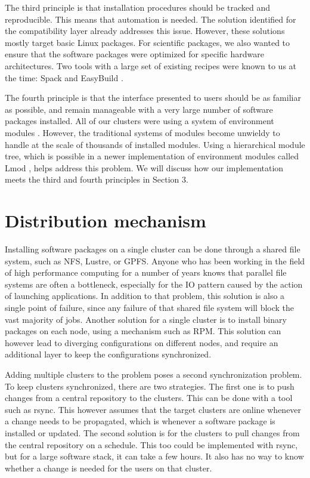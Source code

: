 \documentclass[sigconf]{acmart}
\begin{document}
The third principle is that installation procedures should be tracked and reproducible. This means that automation is
needed. The solution identified for the compatibility layer already addresses this issue. However, these solutions
mostly target basic Linux packages. For scientific packages, we also wanted to ensure that the software packages were
optimized for specific hardware architectures. Two tools with a large set of existing recipes were known to us at the
time: Spack\cite{Spack} and EasyBuild \cite{EasyBuild2012,EasyBuild2014,EasyBuild2016}.

The fourth principle is that the interface presented to users should be as familiar as possible, and remain manageable
with a very large number of software packages installed. All of our clusters were using a system of environment modules
\cite{Modules1991,Modules1996}. However, the traditional systems of modules become unwieldy to handle at the scale of
thousands of installed modules. Using a hierarchical module tree, which is possible in a newer implementation of
environment modules called Lmod \cite{Lmod}, helps address this problem. We will discuss how our implementation meets
the third and fourth principles in Section 3.


\section{Distribution mechanism}
Installing software packages on a single cluster can be done through a shared file system, such as NFS, Lustre, or
GPFS. Anyone who has been working in the field of high performance computing for a number of years knows that parallel
file systems are often a bottleneck, especially for the IO pattern caused by the action of launching applications. In
addition to that problem, this solution is also a single point of failure, since any failure of that shared file system
will block the vast majority of jobs. Another solution for a single cluster is to install binary packages on each node,
using a mechanism such as RPM. This solution can however lead to diverging configurations on different nodes, and
require an additional layer to keep the configurations synchronized. 

Adding multiple clusters to the problem poses a second synchronization problem. To keep clusters synchronized, there
are two strategies. The first one is to push changes from a central repository to the clusters. This can be done with a
tool such as rsync. This however assumes that the target clusters are online whenever a change needs to be propagated,
which is whenever a software package is installed or updated. The second solution is for the clusters to pull changes
from the central repository on a schedule. This too could be implemented with rsync, but for a large software stack, it
can take a few hours. It also has no way to know whether a change is needed for the users on that cluster.
\end{document}
